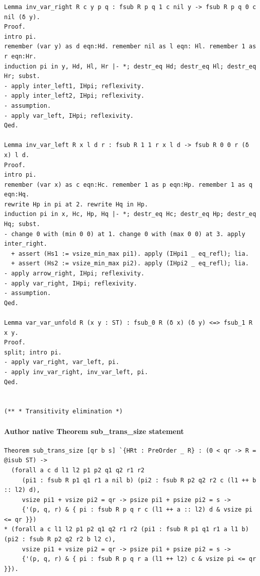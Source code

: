 \documentclass[10pt,a4paper]{article}
\begin{document}
\begin{lstlisting}
Lemma inv_var_right R c y p q : fsub R p q 1 c nil y -> fsub R p q 0 c nil (δ y).
Proof.
intro pi.
remember (var y) as d eqn:Hd. remember nil as l eqn: Hl. remember 1 as r eqn:Hr.
induction pi in y, Hd, Hl, Hr |- *; destr_eq Hd; destr_eq Hl; destr_eq Hr; subst.
- apply inter_left1, IHpi; reflexivity.
- apply inter_left2, IHpi; reflexivity.
- assumption.
- apply var_left, IHpi; reflexivity.
Qed.

Lemma inv_var_left R x l d r : fsub R 1 1 r x l d -> fsub R 0 0 r (δ x) l d.
Proof.
intro pi.
remember (var x) as c eqn:Hc. remember 1 as p eqn:Hp. remember 1 as q eqn:Hq.
rewrite Hp in pi at 2. rewrite Hq in Hp.
induction pi in x, Hc, Hp, Hq |- *; destr_eq Hc; destr_eq Hp; destr_eq Hq; subst.
- change 0 with (min 0 0) at 1. change 0 with (max 0 0) at 3. apply inter_right.
  + assert (Hs1 := vsize_min_max pi1). apply (IHpi1 _ eq_refl); lia.
  + assert (Hs2 := vsize_min_max pi2). apply (IHpi2 _ eq_refl); lia.
- apply arrow_right, IHpi; reflexivity.
- apply var_right, IHpi; reflexivity.
- assumption.
Qed.

Lemma var_var_unfold R (x y : ST) : fsub_0 R (δ x) (δ y) <=> fsub_1 R x y.
Proof.
split; intro pi.
- apply var_right, var_left, pi.
- apply inv_var_right, inv_var_left, pi.
Qed.


(** * Transitivity elimination *)

\end{lstlisting}

\paragraph{Author native Theorem sub\_trans\_size statement}
\begin{lstlisting}
Theorem sub_trans_size [qr b s] `{HRt : PreOrder _ R} : (0 < qr -> R = @isub ST) ->
  (forall a c d l1 l2 p1 p2 q1 q2 r1 r2
     (pi1 : fsub R p1 q1 r1 a nil b) (pi2 : fsub R p2 q2 r2 c (l1 ++ b :: l2) d),
     vsize pi1 + vsize pi2 = qr -> psize pi1 + psize pi2 = s ->
     {'(p, q, r) & { pi : fsub R p q r c (l1 ++ a :: l2) d & vsize pi <= qr }})
* (forall a c l1 l2 p1 p2 q1 q2 r1 r2 (pi1 : fsub R p1 q1 r1 a l1 b) (pi2 : fsub R p2 q2 r2 b l2 c),
     vsize pi1 + vsize pi2 = qr -> psize pi1 + psize pi2 = s ->
     {'(p, q, r) & { pi : fsub R p q r a (l1 ++ l2) c & vsize pi <= qr }}).
\end{lstlisting}
\end{document}
